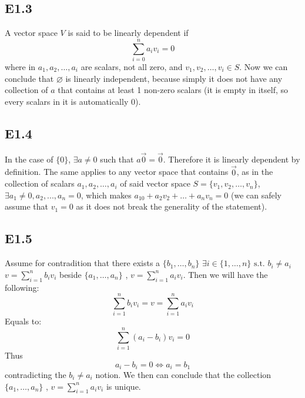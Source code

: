 \documentclass[12pt]{article}
\begin{document}
\subsection*{E1.3}
A vector space $V$ is said to be linearly dependent if $$\sum_{i=0}^n a_i v_i=0$$ where in $a_1, a_2,\ldots,a_i$ are scalars, not all zero, and $v_1,v_2,\ldots,v_i \in S$. Now we can conclude that ${\varnothing}$ is linearly independent, because simply it does not have any collection of $a$ that contains at least 1 non-zero scalars (it is empty in itself, so every scalars in it is automatically $0$).

\subsection*{E1.4}
In the case of $\{0\}$, $\exists a \neq 0$ such that $a\vec{0}=\vec{0}$. Therefore it is linearly dependent by definition. The same applies to any vector space that contains
$\vec{0}$, as in the collection of scalars $a_1, a_2,\ldots,a_i$ of said vector space $S=\{v_1,v_2,\ldots,v_n\}$, $\exists a_1 \neq 0, a_2,...,a_n=0$, which makes $a_10 + a_2v_2 +\ldots + a_nv_n = 0$ (we can safely assume that $v_1=0$ as it does not break the generality of the statement).

\subsection{E1.5}
Assume for contradition that there exists a $\{b_1, \dots, b_n\}$ $\exists i \in \{1,\dots,n\} \text{ s.t. } b_i \neq a_i$ $v = \sum_{i=1}^n b_i v_i$ beside $\{a_1, \dots, a_n\}$ , $v = \sum_{i=1}^n a_i v_i$. Then we will have the following: 
$$\sum_{i=1}^n b_i v_i=v=\sum_{i=1}^n a_i v_i$$
Equals to:
$$\sum_{i=1}^n (a_i- b_i) v_i=0$$
Thus
$$a_i- b_i = 0 \Leftrightarrow a_i = b_1$$
contradicting the $b_i \neq a_i$ notion. We then can conclude that the collection $\{a_1, \dots, a_n\}$ , $v = \sum_{i=1}^n a_i v_i$ is unique.


\newpage 
\end{document}
